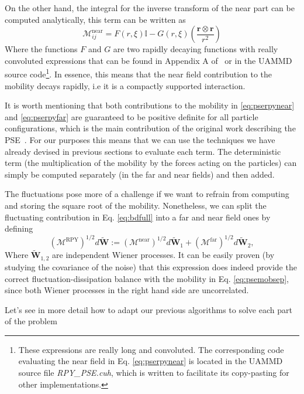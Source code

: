 \documentclass[ twoside,openright,titlepage,numbers=noenddot,%
headinclude,footinclude,cleardoublepage=empty,abstract=on,
BCOR=5mm,paper=b5,fontsize=11pt, dvipsnames
]{scrreprt}
\renewcommand{\vec}[1]{\bm{#1}}
\newcommand{\tens}[1]{\bm{\mathcal{#1}}}
\newcommand{\uammd}{\gls{UAMMD}\xspace}
\newcommand{\near}{\textrm{near}}
\newcommand{\far}{\textrm{far}}
\newcommand{\noise}{\widetilde{W}}
\begin{document}
On the other hand, the integral for the inverse transform of the near part can be computed analytically, this term can be written as
\begin{equation}
  \label{eq:pserpynear}
  \tens{M}_{ij}^{\near}= F(r,\xi)\mathbb I - G(r,\xi)\left(\frac{\vec{r}\otimes\vec{r}}{r^2}\right)
\end{equation}
Where the functions $F$ and $G$ are two rapidly decaying functions with really convoluted expressions that can be found in Appendix A of~\cite{Fiore2017} or in the \uammd source code\footnote{These expressions are really long and convoluted. The corresponding code evaluating the near field in Eq. \eqref{eq:pserpynear} is located in the \uammd source file \emph{RPY\_PSE.cuh}, which is written to facilitate its copy-pasting for other implementations.}. In essence, this means that the near field contribution to the mobility decays rapidly, i.e it is a compactly supported interaction.

It is worth mentioning that both contributions to the mobility in \eqref{eq:pserpynear} and \eqref{eq:pserpyfar} are guaranteed to be positive definite for all particle configurations, which is the main contribution of the original work describing the \gls{PSE}~\cite{Fiore2017}.
For our purposes this means that we can use the techniques we have already devised in previous sections to evaluate each term. The deterministic term (the multiplication of the mobility by the forces acting on the particles) can simply be computed separately (in the far and near fields) and then added.

The fluctuations pose more of a challenge if we want to refrain from computing and storing the square root of the mobility. Nonetheless, we can split the fluctuating contribution in Eq. \eqref{eq:bdfull} into a far and near field ones by defining
\begin{equation}
  \label{eq:psenoise}
  (\tens{M}^{\textrm{RPY}})^{1/2} d\vec{\noise} :=  (\tens{M}^{\near})^{1/2} d\vec{\noise}_1 + (\tens{M}^{\far})^{1/2} d\vec{\noise}_2,
\end{equation}
Where $\vec{\noise}_{1,2}$ are independent Wiener processes. It can be easily proven (by studying the covariance of the noise) that this expression does indeed provide the correct fluctuation-dissipation balance with the mobility in Eq. \eqref{eq:psemobsep}, since both Wiener processes in the right hand side are uncorrelated. 

Let's see in more detail how to adapt our previous algorithms to solve each part of the problem
\end{document}
